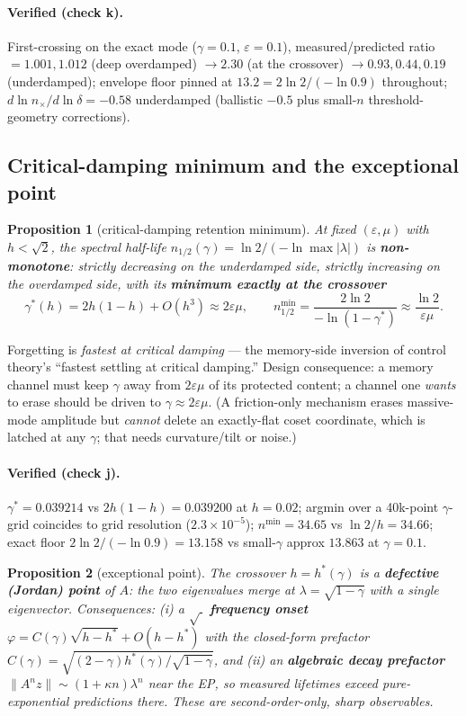 \documentclass[11pt]{article}
\theoremstyle{plain}
\newtheorem{proposition}{Proposition}
\theoremstyle{definition}
\begin{document}
\paragraph{Verified (check k).} First-crossing on the exact mode ($\gamma=0.1$, $\varepsilon=0.1$), measured/predicted ratio $=1.001,1.012$ (deep overdamped) $\to2.30$ (at the crossover) $\to0.93,0.44,0.19$ (underdamped); envelope floor pinned at $13.2=2\ln2/(-\ln0.9)$ throughout; $d\ln n_\times/d\ln\delta=-0.58$ underdamped (ballistic $-0.5$ plus small-$n$ threshold-geometry corrections).

\subsection{Critical-damping minimum and the exceptional point}
\begin{proposition}[critical-damping retention minimum]\label{prop:crit}
At fixed $(\varepsilon,\mu)$ with $h<\sqrt2$, the spectral half-life $n_{1/2}(\gamma)=\ln2/(-\ln\max|\lambda|)$ is \textbf{non-monotone}: strictly decreasing on the underdamped side, strictly increasing on the overdamped side, with its \textbf{minimum exactly at the crossover}
\[ \gamma^*(h)=2h(1-h)+O(h^3)\approx2\varepsilon\mu,\qquad n_{1/2}^{\min}=\frac{2\ln2}{-\ln(1-\gamma^*)}\approx\frac{\ln2}{\varepsilon\mu}. \]
\end{proposition}
Forgetting is \emph{fastest at critical damping} --- the memory-side inversion of control theory's ``fastest settling at critical damping.'' Design consequence: a memory channel must keep $\gamma$ away from $2\varepsilon\mu$ of its protected content; a channel one \emph{wants} to erase should be driven to $\gamma\approx2\varepsilon\mu$. (A friction-only mechanism erases massive-mode amplitude but \emph{cannot} delete an exactly-flat coset coordinate, which is latched at any $\gamma$; that needs curvature/tilt or noise.)

\paragraph{Verified (check j).} $\gamma^*=0.039214$ vs $2h(1-h)=0.039200$ at $h=0.02$; argmin over a 40k-point $\gamma$-grid coincides to grid resolution ($2.3\times10^{-5}$); $n^{\min}=34.65$ vs $\ln2/h=34.66$; exact floor $2\ln2/(-\ln0.9)=13.158$ vs small-$\gamma$ approx $13.863$ at $\gamma=0.1$.

\begin{proposition}[exceptional point]\label{prop:ep}
The crossover $h=h^*(\gamma)$ is a \textbf{defective (Jordan) point} of $A$: the two eigenvalues merge at $\lambda=\sqrt{1-\gamma}$ with a single eigenvector. Consequences: (i) a $\sqrt{\ }$ \textbf{frequency onset} $\varphi=C(\gamma)\sqrt{h-h^*}+O(h-h^*)$ with the closed-form prefactor $C(\gamma)=\sqrt{(2-\gamma)h^*(\gamma)/\sqrt{1-\gamma}}$, and (ii) an \textbf{algebraic decay prefactor} $\lVert A^nz\rVert\sim(1+\kappa n)\lambda^n$ near the EP, so measured lifetimes exceed pure-exponential predictions there. These are second-order-only, sharp observables.
\end{proposition}
\end{document}
